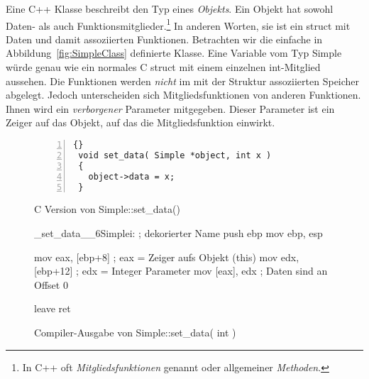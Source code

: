 Eine C++ Klasse beschreibt den Typ eines \emph{Objekts}. Ein Objekt
hat sowohl Daten- als auch Funktionsmitglieder.\footnote{In C++ oft
\emph{Mitgliedsfunktionen} genannt oder allgemeiner \emph{Methoden}.
} In anderen Worten, sie ist ein {\code struct} mit
Daten und damit assoziierten Funktionen. Betrachten wir die einfache
in Abbildung~\ref{fig:SimpleClass} definierte Klasse. Eine Variable
vom Typ {\code Simple} w\"{u}rde genau wie ein normales C {\code struct}
mit einem einzelnen {\code int}-Mitglied aussehen.
 Die Funktionen werden \emph{nicht}
im mit der Struktur assoziierten Speicher abgelegt. Jedoch
unterscheiden sich Mitgliedsfunktionen von anderen Funktionen. Ihnen
wird ein \emph{verborgener} Parameter mitgegeben. Dieser Parameter
ist ein Zeiger auf das Objekt, auf das die Mitgliedsfunktion
einwirkt.

\begin{figure}[t]
\begin{lstlisting}[numbers=left]{}
 void set_data( Simple *object, int x )
 {
   object->data = x;
 }
\end{lstlisting}
\caption{C Version von Simple::set\_data()\label{fig:SimpleCVer}}
\end{figure}


\begin{figure}[t]
\begin{AsmCodeListing}[commandchars=\\\{\}]
 _set_data__6Simplei:         ; dekorierter Name
     push   ebp                                                     \label{line:set_data1}
     mov    ebp, esp                                                \label{line:set_data2}

     mov    eax, [ebp+8]      ; eax = Zeiger aufs Objekt (this)     \label{line:set_data3}
     mov    edx, [ebp+12]     ; edx = Integer Parameter             \label{line:set_data4}
     mov    [eax], edx        ; Daten sind an Offset 0              \label{line:set_data5}

     leave
     ret
\end{AsmCodeListing}
\caption{Compiler-Ausgabe von Simple::set\_data( int )
\label{fig:SimpleAsm}}
\end{figure}


